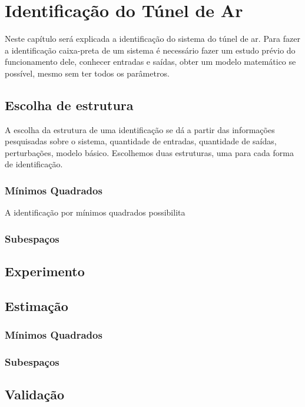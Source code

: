 \chapter{Identificação do Túnel de Ar} \label{cap4}
Neste capítulo será explicada a identificação do sistema do túnel de ar. Para fazer a identificação caixa-preta de um sistema é necessário fazer um estudo prévio do funcionamento dele, conhecer entradas e saídas, obter um modelo matemático se possível, mesmo sem ter todos os parâmetros.
\section{Escolha de estrutura}
A escolha da estrutura de uma identificação se dá a partir das informações pesquisadas sobre o sistema, quantidade de entradas, quantidade de saídas, perturbações, modelo básico. Escolhemos duas estruturas, uma para cada forma de identificação.
\subsection{Mínimos Quadrados}
A identificação por mínimos quadrados possibilita 
\subsection{Subespaços}
\section{Experimento}
\section{Estimação}
\subsection{Mínimos Quadrados}
\subsection{Subespaços}
\section{Validação}




